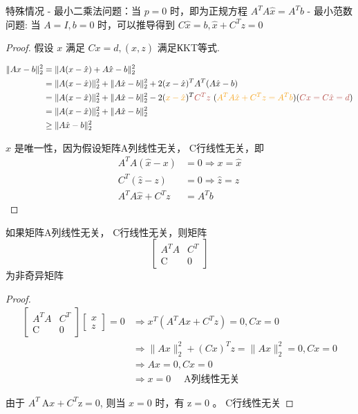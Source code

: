 特殊情况
- 最小二乘法问题：当 $ p=0 $ 时，即为正规方程 $ A^{T} A \hat{x}=A^{T} b $
- 最小范数问题: 当 $ A=I, b=0 $ 时，可以推导得到 $ C \hat{x}=b, \hat{x}+C^{T} z=0 $

\begin{proof}
    假设 $ x $ 满足 $ C x=d,(\hat{x}, z) $ 满足КKT等式.

    $$\begin{aligned}
        \| Ax-b\| _{2}^{2} & =\| A(x-\hat{x} )+A\hat{x} -b\| _{2}^{2}\\
         & =\| A(x-\hat{x} )\| _{2}^{2} +\| A\hat{x} -b\| _{2}^{2} +2(x-\hat{x} )^{T} A^{T} (A\hat{x} -b)\\
         & = \| A(x-\hat{x} )\| _{2}^{2} +\| A\hat{x} -b\| _{2}^{2} -2(\textcolor[rgb]{0.96,0.65,0.14}{x-\hat{x}} )^{T}\textcolor[rgb]{0.72,0.33,0.31}{C^{T} z\ }\textcolor[rgb]{0,0,0}{(}\textcolor[rgb]{0.96,0.65,0.14}{A^{T} A\hat{x} +C^{T} z=A^{T} b}\textcolor[rgb]{0,0,0}{)(}\textcolor[rgb]{0.72,0.33,0.31}{Cx=C\hat{x} =d}\textcolor[rgb]{0,0,0}{)}\\
         & =\| A(x-\hat{x} )\| _{2}^{2} +\| A\hat{x} -b\| _{2}^{2}\\
         & \geq \| A\hat{x} -b\| _{2}^{2}
        \end{aligned}$$

        $ \hat{x} $ 是唯一性，因为假设矩阵A列线性无关， C行线性无关，即
$$
\begin{aligned}
A^{T} A(\hat{x}-x) &=0 \Rightarrow x=\hat{x} \\
C^{T}(\hat{z}-z) &=0 \Rightarrow \hat{z}=z \\
A^{T} A \hat{x}+C^{T} z &=A^{T} b
\end{aligned}
$$
\end{proof}

\begin{theorem}
    如果矩阵A列线性无关， C行线性无关，则矩阵
$$
\left[\begin{array}{cc}
A^{T} A & C^{T} \\
\mathrm{C} & 0
\end{array}\right]
$$
为非奇异矩阵
\end{theorem}

\begin{proof}
    $$ \begin{aligned}\left[\begin{array}{cc}A^{T} A & C^{T} \\ \mathrm{C} & 0\end{array}\right]\left[\begin{array}{c}x \\ z\end{array}\right]=0 & \Rightarrow x^{T}\left(A^{T} A x+C^{T} z\right)=0, C x=0 \\ & \Rightarrow\|A x\|_{2}^{2}+(C x)^{T} z=\|A x\|_{2}^{2}=0, C x=0 \\ & \Rightarrow A x=0, C x=0 \\ & \Rightarrow x=0 \quad \text { A列线性无关 } \end{aligned} $$

    由于 $ A^{T} \mathrm{~A} x+C^{T} \mathrm{z}=0 $, 则当 $ x=0 $ 时，有 $ \mathrm{z}=0 $ 。 C行线性无关
\end{proof}

